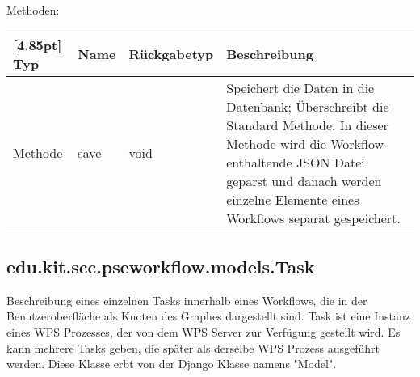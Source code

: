         
             Methoden:
	        \begin{center}
	        	\setlength\tabcolsep{5pt}
	        	\renewcommand{\arraystretch}{1.5}
	        	
	        	\begin{tabularx}{\textwidth}{|l|l|l|X|}
	        		\hline
	        		\rowcolor[gray]{0.75}[4.85pt]
	        		Typ & Name & Rückgabetyp & Beschreibung \\ \hline 
	        		Methode & save & void & Speichert die Daten in die Datenbank; Überschreibt die Standard Methode. In dieser Methode wird die Workflow enthaltende JSON Datei geparst und danach werden einzelne Elemente eines Workflows separat gespeichert. \\ 
	        		\hline
	        	\end{tabularx}
	        \end{center}
        \subsection{edu.kit.scc.pseworkflow.models.Task}	
    		Beschreibung eines einzelnen Tasks innerhalb eines Workflows, die in der Benutzeroberfläche als Knoten des Graphes dargestellt sind. Task ist eine Instanz eines WPS Prozesses, der von dem WPS Server zur Verfügung gestellt wird. Es kann mehrere Tasks geben, die später als derselbe WPS Prozess ausgeführt werden. \newline
    		Diese Klasse erbt von der Django Klasse namens "Model".
    		
